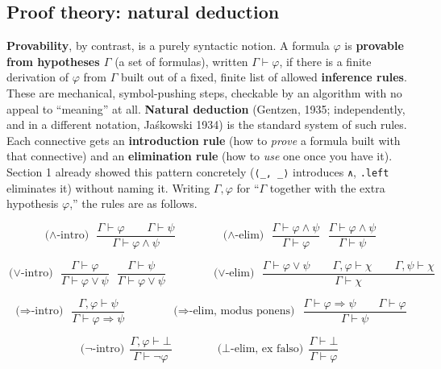 \subsection{Proof theory: natural deduction}\label{sec:04-propositions-and-proofs:02-logic-recap:4}

\textbf{Provability}, by contrast, is a purely syntactic notion. A formula \(\varphi\) is \textbf{provable from hypotheses \(\Gamma\)} (a set of formulas), written \(\Gamma \vdash \varphi\), if there is a finite derivation of \(\varphi\) from \(\Gamma\) built out of a fixed, finite list of allowed \textbf{inference rules}. These are mechanical, symbol-pushing steps, checkable by an algorithm with no appeal to ``meaning'' at all. \textbf{Natural deduction} (Gentzen, 1935; independently, and in a different notation, Jaśkowski 1934) is the standard system of such rules. Each connective gets an \textbf{introduction rule} (how to \emph{prove} a formula built with that connective) and an \textbf{elimination rule} (how to \emph{use} one once you have it). Section 1 already showed this pattern concretely (\texttt{⟨\_\allowbreak{}, \_\allowbreak{}⟩} introduces \texttt{∧}, \texttt{.left} eliminates it) without naming it. Writing \(\Gamma, \varphi\) for ``\(\Gamma\) together with the extra hypothesis \(\varphi\),'' the rules are as follows.

\[
\text{($\wedge$-intro)}\ \ \frac{\Gamma \vdash \varphi \qquad \Gamma \vdash \psi}
{\Gamma \vdash \varphi \wedge \psi}
\qquad\qquad
\text{($\wedge$-elim)}\ \ \frac{\Gamma \vdash \varphi \wedge \psi}{\Gamma \vdash \varphi}
\ \ \ \frac{\Gamma \vdash \varphi \wedge \psi}{\Gamma \vdash \psi}
\]

\[
\text{($\vee$-intro)}\ \ \frac{\Gamma \vdash \varphi}{\Gamma \vdash \varphi \vee \psi}
\ \ \ \frac{\Gamma \vdash \psi}{\Gamma \vdash \varphi \vee \psi}
\qquad\qquad
\text{($\vee$-elim)}\ \ \frac{\Gamma \vdash \varphi \vee \psi \qquad \Gamma, \varphi \vdash \chi \qquad \Gamma, \psi \vdash \chi}{\Gamma \vdash \chi}
\]

\[
\text{($\Rightarrow$-intro)}\ \ \frac{\Gamma, \varphi \vdash \psi}{\Gamma \vdash \varphi \Rightarrow \psi}
\qquad\qquad
\text{($\Rightarrow$-elim, modus ponens)}\ \ \frac{\Gamma \vdash \varphi \Rightarrow \psi \qquad \Gamma \vdash \varphi}{\Gamma \vdash \psi}
\]

\[
\text{($\neg$-intro)}\ \ \frac{\Gamma, \varphi \vdash \bot}{\Gamma \vdash \neg\varphi}
\qquad\qquad
\text{($\bot$-elim, ex falso)}\ \ \frac{\Gamma \vdash \bot}{\Gamma \vdash \varphi}
\]


